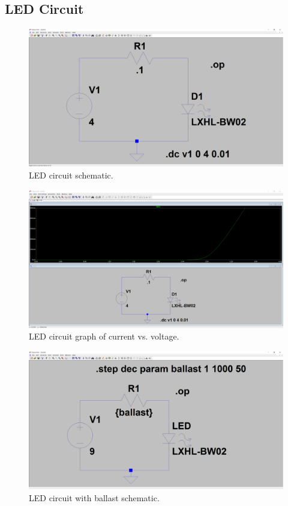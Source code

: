 \documentclass[10pt]{article}
\begin{document}
\subsection*{LED Circuit}
\begin{figure}[H]
	\centering
		\includegraphics[width=5in]{Capture6}
	\caption{LED circuit schematic.}
\end{figure}
\begin{figure}[H]
	\centering
		\includegraphics[width=5in]{Capture7}
	\caption{LED circuit graph of current vs. voltage.}
\end{figure}
\begin{figure}[H]
	\centering
		\includegraphics[width=5in]{Capture8}
	\caption{LED circuit with ballast schematic.}
\end{figure}
\end{document}
